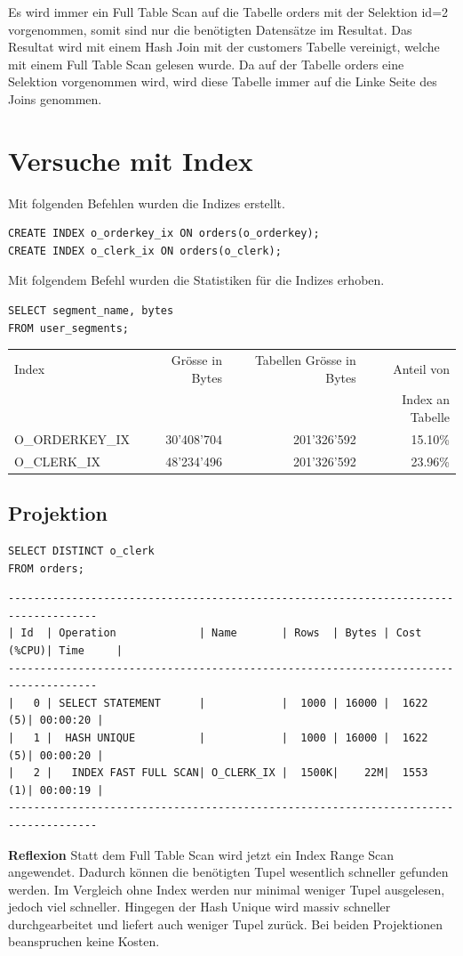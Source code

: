 \documentclass[10pt]{article}
\begin{document}
Es wird immer ein Full Table Scan auf die Tabelle orders mit der Selektion id=2 
vorgenommen, somit sind nur die benötigten Datensätze im Resultat. Das Resultat wird mit 
einem Hash Join mit der customers Tabelle vereinigt, welche mit einem Full Table Scan 
gelesen wurde. Da auf der Tabelle orders eine Selektion vorgenommen wird, wird diese 
Tabelle immer auf die Linke Seite des Joins genommen.

\section{Versuche mit Index}
Mit folgenden Befehlen wurden die Indizes erstellt.
\begin{lstlisting}[style=sql]
CREATE INDEX o_orderkey_ix ON orders(o_orderkey);
CREATE INDEX o_clerk_ix ON orders(o_clerk);
\end{lstlisting}

Mit folgendem Befehl wurden die Statistiken für die Indizes erhoben.
\begin{lstlisting}[style=sql]
SELECT segment_name, bytes
FROM user_segments;
\end{lstlisting}

\begin{tabular}{l||r|r|r}
  Index & Grösse in Bytes & Tabellen Grösse in Bytes & Anteil von \\ 
  & & &  Index an Tabelle \\ \hline
  \hline
  O\_ORDERKEY\_IX & 30'408'704 & 201'326'592 & 15.10\%  \\ \hline
  O\_CLERK\_IX & 48'234'496 & 201'326'592 & 23.96\% \\ 
\end{tabular}

\subsection{Projektion}
\begin{lstlisting}[style=sql]
SELECT DISTINCT o_clerk
FROM orders;
\end{lstlisting}
\begin{lstlisting}[style=queryexecutionplan]
------------------------------------------------------------------------------------
| Id  | Operation             | Name       | Rows  | Bytes | Cost (%CPU)| Time     |
------------------------------------------------------------------------------------
|   0 | SELECT STATEMENT      |            |  1000 | 16000 |  1622   (5)| 00:00:20 |
|   1 |  HASH UNIQUE          |            |  1000 | 16000 |  1622   (5)| 00:00:20 |
|   2 |   INDEX FAST FULL SCAN| O_CLERK_IX |  1500K|    22M|  1553   (1)| 00:00:19 |
------------------------------------------------------------------------------------
\end{lstlisting}
\textbf{Reflexion} \newline
Statt dem Full Table Scan wird jetzt ein Index Range Scan angewendet. Dadurch können 
die benötigten Tupel wesentlich schneller gefunden werden. Im Vergleich ohne Index 
werden nur minimal weniger Tupel ausgelesen, jedoch viel schneller. Hingegen der 
Hash Unique wird massiv schneller durchgearbeitet und liefert auch weniger Tupel zurück.
Bei beiden Projektionen beanspruchen keine Kosten.
\end{document}

